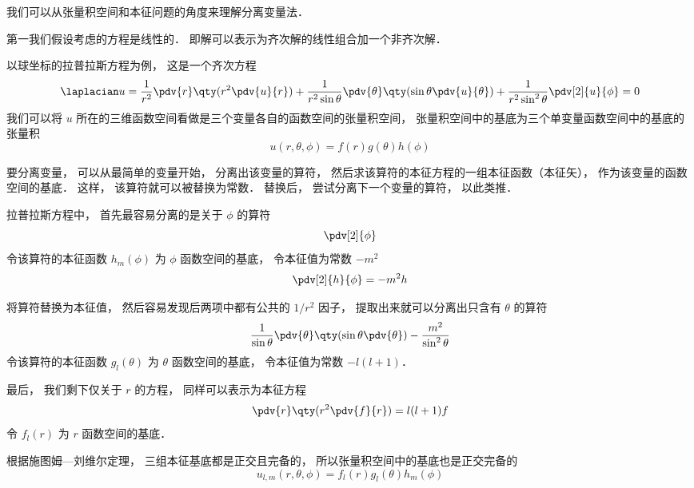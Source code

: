 
我们可以从张量积空间和本征问题的角度来理解分离变量法．

第一我们假设考虑的方程是线性的． 即解可以表示为齐次解的线性组合加一个非齐次解．

以球坐标的拉普拉斯方程为例， 这是一个齐次方程
\begin{equation}
\laplacian u = \frac{1}{r^2} \pdv{r} \qty(r^2 \pdv{u}{r}) + \frac{1}{r^2 \sin\theta}\pdv{\theta} \qty(\sin \theta \pdv{u}{\theta}) + \frac{1}{r^2 \sin^2 \theta} \pdv[2]{u}{\phi} = 0
\end{equation}
我们可以将 $u$ 所在的三维函数空间看做是三个变量各自的函数空间的张量积空间， 张量积空间中的基底为三个单变量函数空间中的基底的张量积
\begin{equation}
u(r, \theta, \phi) = f(r) g(\theta) h(\phi)
\end{equation}

要分离变量， 可以从最简单的变量开始， 分离出该变量的算符， 然后求该算符的本征方程的一组本征函数（本征矢）， 作为该变量的函数空间的基底． 这样， 该算符就可以被替换为常数． 替换后， 尝试分离下一个变量的算符， 以此类推．

拉普拉斯方程中， 首先最容易分离的是关于 $\phi$ 的算符
\begin{equation}
\pdv[2]{\phi}
\end{equation}
令该算符的本征函数 $h_m(\phi)$ 为 $\phi$ 函数空间的基底， 令本征值为常数 $-m^2$
\begin{equation}
\pdv[2]{h}{\phi} = -m^2 h
\end{equation}
 
将算符替换为本征值， 然后容易发现后两项中都有公共的 $1/r^2$ 因子， 提取出来就可以分离出只含有 $\theta$ 的算符
\begin{equation}
 \frac{1}{\sin\theta}\pdv{\theta} \qty(\sin \theta \pdv{\theta}) - \frac{m^2}{\sin^2 \theta}
\end{equation}
令该算符的本征函数 $g_l(\theta)$ 为 $\theta$ 函数空间的基底， 令本征值为常数 $-l(l+1)$．

最后， 我们剩下仅关于 $r$ 的方程， 同样可以表示为本征方程
\begin{equation}
\pdv{r} \qty(r^2 \pdv{f}{r}) = l(l+1) f
\end{equation}
令 $f_l(r)$ 为 $r$ 函数空间的基底．

根据施图姆—刘维尔定理， 三组本征基底都是正交且完备的， 所以张量积空间中的基底也是正交完备的
\begin{equation}
u_{l,m}(r, \theta, \phi) = f_l(r) g_l(\theta) h_m(\phi)
\end{equation}
